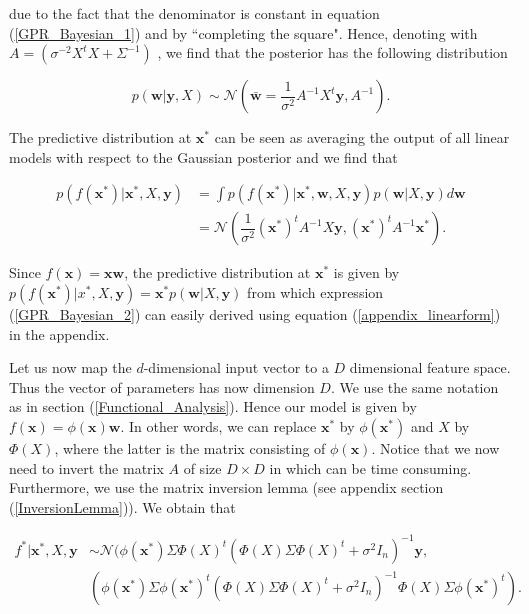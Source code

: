 \documentclass[12pt,a4paper,oneside]{book}
\begin{document}
due to the fact that the denominator is constant in equation (\ref{GPR_Bayesian_1}) and by ``completing the square". Hence, denoting with $A = (\sigma^{-2} X^tX + \Sigma^{-1})$ , we find that the posterior has the following distribution 

\begin{equation}
p(\bm{w}|\bm{y},X) \sim \mathcal{N} (\bar{\bm{w}} = \dfrac{1}{\sigma^2} A^{-1} X^t \bm{y}, A^{-1}).
\end{equation}

The predictive distribution at $\bm{x}^{\ast}$ can be seen as averaging the output of all linear models with respect to the Gaussian posterior and we find that

\begin{align}\label{GPR_Bayesian_2}
p(f(\bm{x}^{\ast})|\bm{x}^{\ast},X,\bm{y}) &= \int p(f(\bm{x}^{\ast})|\bm{x}^{\ast},\bm{w}, X, \bm{y}) p (\bm{w} | X , \bm{y}) d\bm{w} \nonumber \\
&= \mathcal{N}\left( \dfrac{1}{\sigma^2} \left(\bm{x}^{\ast}\right)^t A^{-1} X \bm{y}, \left(\bm{x}^{\ast}\right)^t A^{-1}  \bm{x}^{\ast} \right).
\end{align}

Since $f(\bm{x}) = \bm{x} \bm{w}$, the predictive distribution at $\bm{x}^{\ast}$ is given by $p(f(\bm{x}^{\ast})|x^{\ast},X,\bm{y}) = \bm{x}^{\ast} p(\bm{w}|X,\bm{y})$ from which expression (\ref{GPR_Bayesian_2}) can easily derived using equation (\ref{appendix_linearform}) in the appendix.

Let us now map the $d$-dimensional input vector to a $D$ dimensional feature space. Thus the vector of parameters has now dimension $D$. We use the same notation as in section (\ref{Functional_Analysis}). Hence our model is given by $f(\bm{x}) = \phi(\bm{x}) \bm{w}$. In other words, we can replace $\bm{x}^{\ast}$ by $\phi(\bm{x}^{\ast})$ and $X$ by $\Phi(X)$, where the latter is the matrix consisting of $\phi(\bm{x})$.  Notice that we now need to invert the matrix $A$ of size $D \times D$ in which can be time consuming.  Furthermore, we use the matrix inversion lemma (see appendix section (\ref{InversionLemma})). We obtain that 

\begin{align}
f^{\ast}|\bm{x}^{\ast},X,\bm{y} &\sim \mathcal{N} ( \phi\left(\bm{x}^{\ast}\right) \Sigma \Phi(X)^t  (\Phi(X) \Sigma \Phi(X)^t + \sigma^2 I_n)^{-1} \bm{y}, \nonumber \\
& (\phi (\bm{x}^{\ast} )\Sigma \phi\left(\bm{x}^{\ast}\right)^t (\Phi(X) \Sigma \Phi(X)^t + \sigma^2 I_n)^{-1}  \Phi(X) \Sigma \phi\left(\bm{x}^{\ast}\right)^t ).
\end{align} 
\end{document}
